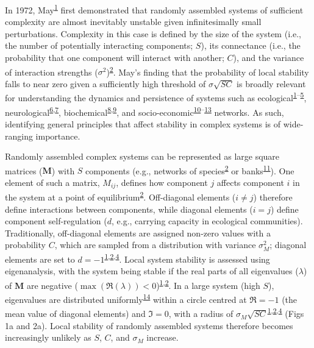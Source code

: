 \documentclass[]{article}
\begin{document}
In 1972, May\textsuperscript{\protect\hyperlink{ref-May1972}{1}} first
demonstrated that randomly assembled systems of sufficient complexity
are almost inevitably unstable given infinitesimally small
perturbations. Complexity in this case is defined by the size of the
system (i.e., the number of potentially interacting components; \(S\)),
its connectance (i.e., the probability that one component will interact
with another; \(C\)), and the variance of interaction strengths
(\(\sigma^{2}\))\textsuperscript{\protect\hyperlink{ref-Allesina2012}{2}}.
May's finding that the probability of local stability falls to near zero
given a sufficiently high threshold of \(\sigma\sqrt{SC}\) is broadly
relevant for understanding the dynamics and persistence of systems such
as
ecological\textsuperscript{\protect\hyperlink{ref-May1972}{1}--\protect\hyperlink{ref-Grilli2017}{5}},
neurological\textsuperscript{\protect\hyperlink{ref-Gray2008}{6},\protect\hyperlink{ref-Gray2009}{7}},
biochemical\textsuperscript{\protect\hyperlink{ref-Rosenfeld2009}{8},\protect\hyperlink{ref-MacArthur2010}{9}},
and
socio-economic\textsuperscript{\protect\hyperlink{ref-May2008}{10}--\protect\hyperlink{ref-Bardoscia2017}{13}}
networks. As such, identifying general principles that affect stability
in complex systems is of wide-ranging importance.

Randomly assembled complex systems can be represented as large square
matrices (\(\mathbf{M}\)) with \(S\) components (e.g., networks of
species\textsuperscript{\protect\hyperlink{ref-Allesina2012}{2}} or
banks\textsuperscript{\protect\hyperlink{ref-Haldane2011}{11}}). One
element of such a matrix, \(M_{ij}\), defines how component \(j\)
affects component \(i\) in the system at a point of
equilibrium\textsuperscript{\protect\hyperlink{ref-Allesina2012}{2}}.
Off-diagonal elements (\(i \neq j\)) therefore define interactions
between components, while diagonal elements (\(i = j\)) define component
self-regulation (\(d\), e.g., carrying capacity in ecological
communities). Traditionally, off-diagonal elements are assigned non-zero
values with a probability \(C\), which are sampled from a distribution
with variance \(\sigma_{M}^{2}\); diagonal elements are set to
\(d = -1\)\textsuperscript{\protect\hyperlink{ref-May1972}{1},\protect\hyperlink{ref-Allesina2012}{2},\protect\hyperlink{ref-Allesina2015}{4}}.
Local system stability is assessed using eigenanalysis, with the system
being stable if the real parts of all eigenvalues (\(\lambda\)) of
\(\mathbf{M}\) are negative
(\(\max\left(\Re(\lambda)\right) < 0\))\textsuperscript{\protect\hyperlink{ref-May1972}{1},\protect\hyperlink{ref-Allesina2012}{2}}.
In a large system (high \(S\)), eigenvalues are distributed
uniformly\textsuperscript{\protect\hyperlink{ref-Tao2010}{14}} within a
circle centred at \(\Re = -1\) (the mean value of diagonal elements) and
\(\Im = 0\), with a radius of
\(\sigma_{M}\sqrt{SC}\)\textsuperscript{\protect\hyperlink{ref-May1972}{1},\protect\hyperlink{ref-Allesina2012}{2},\protect\hyperlink{ref-Allesina2015}{4}}
(Figs 1a and 2a). Local stability of randomly assembled systems
therefore becomes increasingly unlikely as \(S\), \(C\), and
\(\sigma_{M}\) increase.
\end{document}
